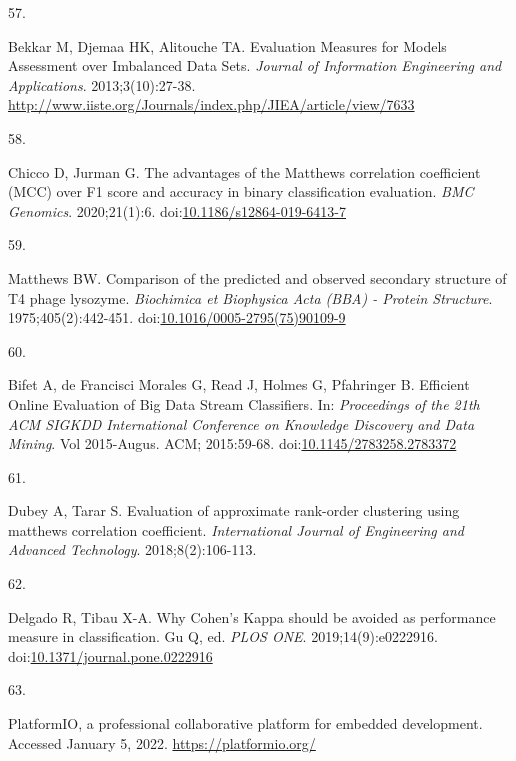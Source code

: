 \documentclass[12pt,twoside]{fmupthesis}
\newlength{\csllabelwidth}
\newlength{\cslhangindent}
\newenvironment{CSLReferences}[2] %
 {%
  \setlength{\parindent}{0pt}
  \ifodd #1 \everypar{\setlength{\hangindent}{\cslhangindent}}\ignorespaces\fi
  \ifnum #2 > 0
  \setlength{\parskip}{#2\baselineskip}
  \fi
 }%
 {}
\newcommand{\CSLLeftMargin}[1]{\parbox[t]{\csllabelwidth}{#1}}
\newcommand{\CSLRightInline}[1]{\parbox[t]{\linewidth - \csllabelwidth}{#1}}
\begin{document}
\begin{CSLReferences}{0}{0}
\leavevmode{}%
\CSLLeftMargin{57. }
\CSLRightInline{Bekkar M, Djemaa HK, Alitouche TA. {Evaluation Measures for Models Assessment over Imbalanced Data Sets}. \emph{Journal of Information Engineering and Applications}. 2013;3(10):27-38. \url{http://www.iiste.org/Journals/index.php/JIEA/article/view/7633}}

\leavevmode{}%
\CSLLeftMargin{58. }
\CSLRightInline{Chicco D, Jurman G. {The advantages of the Matthews correlation coefficient (MCC) over F1 score and accuracy in binary classification evaluation}. \emph{BMC Genomics}. 2020;21(1):6. doi:\href{https://doi.org/10.1186/s12864-019-6413-7}{10.1186/s12864-019-6413-7}}

\leavevmode{}%
\CSLLeftMargin{59. }
\CSLRightInline{Matthews BW. {Comparison of the predicted and observed secondary structure of T4 phage lysozyme}. \emph{Biochimica et Biophysica Acta (BBA) - Protein Structure}. 1975;405(2):442-451. doi:\href{https://doi.org/10.1016/0005-2795(75)90109-9}{10.1016/0005-2795(75)90109-9}}

\leavevmode{}%
\CSLLeftMargin{60. }
\CSLRightInline{Bifet A, de Francisci Morales G, Read J, Holmes G, Pfahringer B. {Efficient Online Evaluation of Big Data Stream Classifiers}. In: \emph{Proceedings of the 21th ACM SIGKDD International Conference on Knowledge Discovery and Data Mining}. Vol 2015-Augus. ACM; 2015:59-68. doi:\href{https://doi.org/10.1145/2783258.2783372}{10.1145/2783258.2783372}}

\leavevmode{}%
\CSLLeftMargin{61. }
\CSLRightInline{Dubey A, Tarar S. {Evaluation of approximate rank-order clustering using matthews correlation coefficient}. \emph{International Journal of Engineering and Advanced Technology}. 2018;8(2):106-113.}

\leavevmode{}%
\CSLLeftMargin{62. }
\CSLRightInline{Delgado R, Tibau X-A. {Why Cohen's Kappa should be avoided as performance measure in classification}. Gu Q, ed. \emph{PLOS ONE}. 2019;14(9):e0222916. doi:\href{https://doi.org/10.1371/journal.pone.0222916}{10.1371/journal.pone.0222916}}

\leavevmode{}%
\CSLLeftMargin{63. }
\CSLRightInline{PlatformIO, a professional collaborative platform for embedded development. Accessed January 5, 2022. \url{https://platformio.org/}}


\end{CSLReferences}
\end{document}
